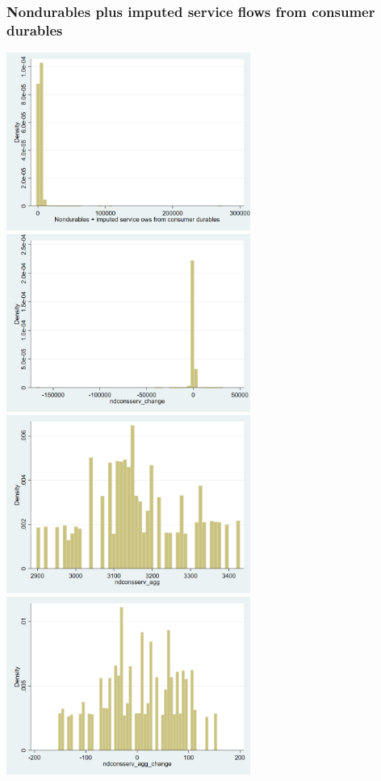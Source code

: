 \documentclass[12pt,a4paper]{article}
\begin{document}
\subsubsection*{Nondurables plus imputed service flows from consumer durables}
\begin{center}
\includegraphics[width=8cm]{graphs/ndconsserv.png}
\includegraphics[width=8cm]{graphs/ndconsserv_change.png}\\
\includegraphics[width=8cm]{graphs/ndconsserv_agg.png}
\includegraphics[width=8cm]{graphs/ndconsserv_agg_change.png}\\

\end{center}
\end{document}
